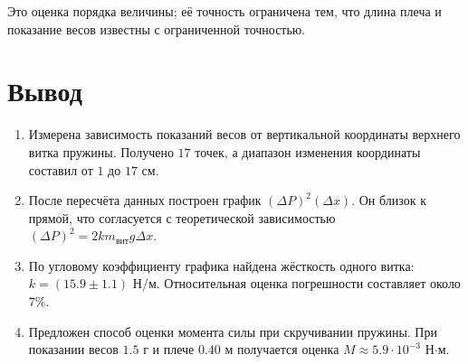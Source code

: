 \documentclass[12pt]{article}
\begin{document}
    Это оценка порядка величины; её точность ограничена тем, что длина плеча и показание весов известны с ограниченной точностью.

    \section{Вывод}

    \begin{enumerate}
        \item Измерена зависимость показаний весов от вертикальной координаты верхнего витка пружины. Получено $17$ точек, а диапазон изменения координаты составил от $1$ до $17$ см.
        \item После пересчёта данных построен график $(\Delta P)^2(\Delta x)$. Он близок к прямой, что согласуется с теоретической зависимостью $(\Delta P)^2 = 2 k m_{\text{вит}} g \Delta x$.
        \item По угловому коэффициенту графика найдена жёсткость одного витка: $k = (15.9 \pm 1.1)$ Н/м. Относительная оценка погрешности составляет около $7\%$.
        \item Предложен способ оценки момента силы при скручивании пружины. При показании весов $1.5$ г и плече $0.40$ м получается оценка $M \approx 5.9 \cdot 10^{-3}$ Н$\cdot$м.
    \end{enumerate}
\end{document}
